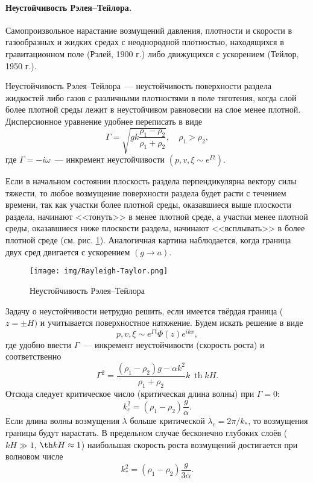 \paragraph{Неустойчивость Рэлея--Тейлора.} Самопроизвольное нарастание возмущений давления, плотности и скорости в газообразных и жидких средах с неоднородной плотностью, находящихся в гравитационном поле (Рэлей, 1900 г.) либо движущихся с ускорением (Тейлор, 1950 г.).

Неустойчивость Рэлея--Тейлора~--- неустойчивость поверхности раздела жидкостей либо газов с различными плотностями в поле тяготения, когда слой более плотной среды лежит в неустойчивом равновесии на слое менее плотной. Дисперсионное уравнение удобнее переписать в виде
\begin{equation}
	\Gamma = \sqrt{gk \frac{\rho_1 - \rho_2}{\rho_1 + \rho_2}}, \quad \rho_1 > \rho_2,
\end{equation}
где $\Gamma=-i\omega$~---  инкремент неустойчивости $(p,v,\xi\sim e^{\Gamma t})$.

Если в начальном состоянии плоскость раздела перпендикулярна вектору силы тяжести, то любое возмущение поверхности раздела будет расти с течением времени, так как участки более плотной среды, оказавшиеся выше плоскости раздела, начинают <<тонуть>> в менее плотной среде, а участки менее плотной среды, оказавшиеся ниже плоскости раздела, начинают <<всплывать>> в более плотной среде (см. рис. \ref{fig:retal}). Аналогичная картина наблюдается, когда граница двух сред двигается с ускорением $(g\to a)$.

\begin{figure}[H]
	\centering
	\texttt{[image: img/Rayleigh-Taylor.png]}
	\caption{Неустойчивость Рэлея--Тейлора}
	\label{fig:retal}
\end{figure}

Задачу о неустойчивости нетрудно решить, если имеется твёрдая граница ($z=\pm H)$ и учитывается поверхностное натяжение. Будем искать решение в виде
\begin{equation}
	p,v,\xi \sim e^{\Gamma t} \Phi (z) e^{ikx},
\end{equation}
где удобно ввести $\Gamma$~--- инкремент неустойчивости (скорость роста) и соответственно
\begin{equation}
	\Gamma^2 = \frac{\left(\rho_1 - \rho_2\right) g-\alpha k^2}{\rho_1 + \rho_2} k\ \operatorname{th} kH.
\end{equation}
Отсюда следует критическое число (критическая длина волны) при $\Gamma=0$:
\begin{equation}
	k_c^2 = \left(\rho_1 - \rho_2\right) \frac{g}{\alpha}.
\end{equation}
Если длина волны возмущения $\lambda$ больше критической $\lambda_c = 2\pi / k_*$, то возмущения границы будут нарастать. В предельном случае бесконечно глубоких слоёв ($kH\gg 1$, $\th kH \approx 1$) наибольшая скорость роста возмущений достигается при волновом числе
\begin{equation}
	k_*^2 = \left(\rho_1 - \rho_2\right) \frac{g}{3\alpha}.
\end{equation}


